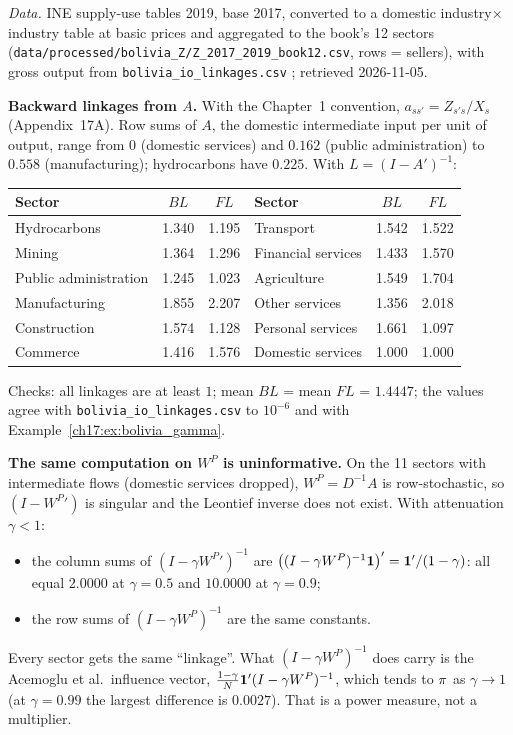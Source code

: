 \documentclass[../solutions_manual.tex]{subfiles}
\begin{document}

\emph{Data.} INE supply-use tables 2019, base 2017, converted to a domestic industry$\times$industry table at basic prices and aggregated to the book's 12 sectors (\nolinkurl{data/processed/bolivia_Z/Z_2017_2019_book12.csv}, rows = sellers), with gross output from \nolinkurl{bolivia_io_linkages.csv} \citep{ine2026sut}; retrieved 2026-11-05.

 \textbf{Backward linkages from $A$.} With the Chapter~1 convention, $a_{ss'} = Z_{s's}/X_s$ (Appendix~17A). Row sums of $A$, the domestic intermediate input per unit of output, range from $0$ (domestic services) and $0.162$ (public administration) to $0.558$ (manufacturing); hydrocarbons have $0.225$. With $L = (I - A')^{-1}$:
\begin{center}
\small
\begin{tabular}{lcc|lcc}
\toprule
Sector & $BL$ & $FL$ & Sector & $BL$ & $FL$ \\
\midrule
Hydrocarbons & 1.340 & 1.195 & Transport & 1.542 & 1.522 \\
Mining & 1.364 & 1.296 & Financial services & 1.433 & 1.570 \\
Public administration & 1.245 & 1.023 & Agriculture & 1.549 & 1.704 \\
Manufacturing & 1.855 & 2.207 & Other services & 1.356 & 2.018 \\
Construction & 1.574 & 1.128 & Personal services & 1.661 & 1.097 \\
Commerce & 1.416 & 1.576 & Domestic services & 1.000 & 1.000 \\
\bottomrule
\end{tabular}
\end{center}
Checks: all linkages are at least $1$; mean $BL$ = mean $FL$ = $1.4447$; the values agree with \nolinkurl{bolivia_io_linkages.csv} to $10^{-6}$ and with Example~\ref{ch17:ex:bolivia_gamma}.

\textbf{The same computation on $W^P$ is uninformative.} On the 11 sectors with intermediate flows (domestic services dropped), $W^P = D^{-1}A$ is row-stochastic, so $(I - W^P{}')$ is singular and the Leontief inverse does not exist. With attenuation $\gamma < 1$:
\begin{itemize}
\item the column sums of $(I - \gamma W^P{}')^{-1}$ are $\big((I-\gamma W^P)^{-1}\mathbf{1}\big)' = \mathbf{1}'/(1-\gamma)$: all equal $2.0000$ at $\gamma = 0.5$ and $10.0000$ at $\gamma = 0.9$;
\item the row sums of $(I - \gamma W^P)^{-1}$ are the same constants.
\end{itemize}
Every sector gets the same ``linkage''. What $(I-\gamma W^P)^{-1}$ does carry is the Acemoglu et al.\ influence vector, $\frac{1-\gamma}{N}\mathbf{1}'(I-\gamma W^P)^{-1}$, which tends to $\pi$ as $\gamma \to 1$ (at $\gamma = 0.99$ the largest difference is $0.0027$). That is a power measure, not a multiplier.
\end{document}
